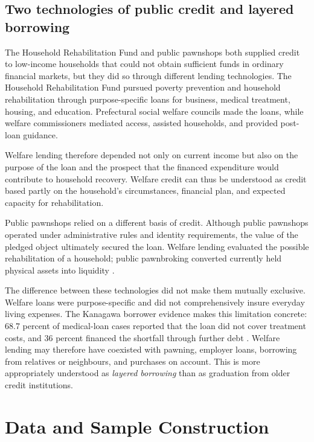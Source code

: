 \documentclass[12pt]{article}
\begin{document}
\subsection{Two technologies of public credit and layered borrowing}

The Household Rehabilitation Fund and public pawnshops both supplied credit to low-income households that could not obtain sufficient funds in ordinary financial markets, but they did so through different lending technologies. The Household Rehabilitation Fund pursued poverty prevention and household rehabilitation through purpose-specific loans for business, medical treatment, housing, and education. Prefectural social welfare councils made the loans, while welfare commissioners mediated access, assisted households, and provided post-loan guidance.

Welfare lending therefore depended not only on current income but also on the purpose of the loan and the prospect that the financed expenditure would contribute to household recovery. Welfare credit can thus be understood as credit based partly on the household's circumstances, financial plan, and expected capacity for rehabilitation.

Public pawnshops relied on a different basis of credit. Although public pawnshops operated under administrative rules and identity requirements, the value of the pledged object ultimately secured the loan. Welfare lending evaluated the possible rehabilitation of a household; public pawnbroking converted currently held physical assets into liquidity \citep{MinistryOfHealth1958, MinistryOfHealth1963}.

The difference between these technologies did not make them mutually exclusive. Welfare loans were purpose-specific and did not comprehensively insure everyday living expenses. The Kanagawa borrower evidence makes this limitation concrete: 68.7 percent of medical-loan cases reported that the loan did not cover treatment costs, and 36 percent financed the shortfall through further debt \citep{Sakai2023}. Welfare lending may therefore have coexisted with pawning, employer loans, borrowing from relatives or neighbours, and purchases on account. This is more appropriately understood as \textit{layered borrowing} than as graduation from older credit institutions.

\newpage
\section{Data and Sample Construction}
\end{document}
